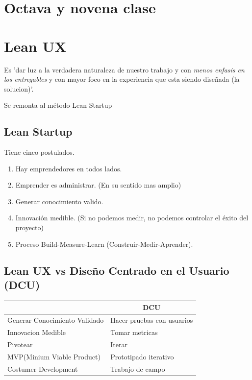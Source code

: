 \documentclass[titlepage,a4paper]{article}
\begin{document}
\section*{Octava y novena clase}
\section{Lean UX}
Es 'dar luz a la verdadera naturaleza de nuestro trabajo y con \emph{menos enfasis en los entregables} y con mayor foco en la experiencia que esta siendo diseñada (la solucion)'.

Se remonta al método Lean Startup
\subsection{Lean Startup}
Tiene cinco postulados.
\begin{enumerate}
    \item Hay emprendedores en todos lados.
    \item Emprender es administrar. (En su sentido mas amplio)
    \item Generar conocimiento valido.
    \item Innovación medible. (Si no podemos medir, no podemos controlar el éxito del proyecto)
    \item Proceso Build-Measure-Learn (Construir-Medir-Aprender).
\end{enumerate}

\subsection{Lean UX vs Diseño Centrado en el Usuario (DCU)}

\begin{center}
\begin{table}[!htb]
\begin{tabular}{|l|l|}
\hline
\rowcolor[HTML]{FFFE65} 
\multicolumn{1}{|c|}{\cellcolor[HTML]{FFFE65}Lean UX} & \multicolumn{1}{c|}{\cellcolor[HTML]{FFFE65}DCU} \\ \hline
Generar Conocimiento Validado                         & Hacer pruebas con usuarios                       \\ \hline
Innovacion Medible                                    & Tomar metricas                                   \\ \hline
Pivotear                                              & Iterar                                           \\ \hline
MVP(Minium Viable Product)                            & Prototipado iterativo                            \\ \hline
Costumer Development                                  & Trabajo de campo                                 \\ \hline
\end{tabular}
\end{table}
\end{center}
\end{document}
